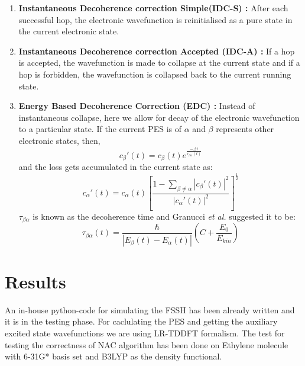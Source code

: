 \documentclass[12pt]{article}
\begin{document}
\begin{enumerate}
\item{\textbf{Instantaneous Decoherence correction Simple(IDC-S) :} After each successful hop, the electronic wavefunction is reinitialised as a pure state in the current electronic state.}
\item{\textbf{Instantaneous Decoherence correction Accepted (IDC-A) :} If a hop is accepted, the wavefunction is made to collapse at the current state and if a hop is forbidden, the wavefunction is collapsed back to the current running state.}
\item{\textbf{Energy Based Decoherence Correction (EDC) :} Instead of instantaneous collapse, here we allow for decay of the electronic wavefunction to a particular state. If the current PES is of $\alpha$ and $\beta$ represents other electronic states, then, 
    \begin{equation}\label{eq:18}
	c_\beta'(t) = c_\beta(t)e^{\frac{-\Delta t}{\tau_{\beta\alpha}(t)}}
    \end{equation}
    and the loss gets accumulated in the current state as:
    \begin{equation}\label{eq:19}
    c_\alpha'(t) = c_\alpha(t)\left[\frac{1-\sum_{\beta\neq\alpha}|c_\beta'(t)|^2}{|c_\alpha'(t)|^2}\right]^{\frac{1}{2}}
    \end{equation}    	 
    $\tau_{\beta\alpha}$ is known as the decoherence time and Granucci \textit{et al.}\cite{granucci} suggested it to be:
    \begin{equation}\label{eq:20}
    \tau_{\beta\alpha}(t) = \frac{\hbar}{|E_\beta(t)-E_\alpha(t)|}\left(C+\frac{E_0}{E_{kin}}\right)
    \end{equation}}
\end{enumerate}

\section{Results}
An in-house python-code for simulating the FSSH has been already written and it is in the testing phase. For caclulating the PES and getting the auxiliary excited state wavefunctions we are using LR-TDDFT formalism. The test for testing the correctness of NAC algorithm has been done on Ethylene molecule with 6-31G* basis set and B3LYP as the density functional.\\
 
\end{document}
